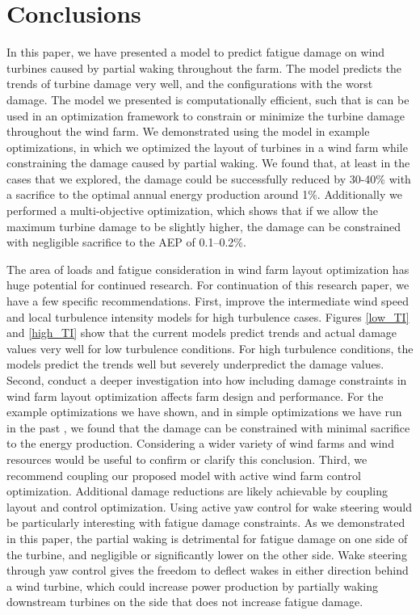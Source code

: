 \documentclass[11pt,letterpaper]{article}
\begin{document}
\section{Conclusions}
In this paper, we have presented a model to predict fatigue damage on wind turbines caused by partial waking throughout the farm. The model predicts the trends of turbine damage very well, and the configurations with the worst damage. The model we presented is computationally efficient, such that is can be used in an optimization framework to constrain or minimize the turbine damage throughout the wind farm. We demonstrated using the model in example optimizations, in which we optimized the layout of turbines in a wind farm while constraining the damage caused by partial waking. We found that, at least in the cases that we explored, the damage could be successfully reduced by 30-40\% with a sacrifice to the optimal annual energy production around 1\%. Additionally we performed a multi-objective optimization, which shows that if we allow the maximum turbine damage to be slightly higher, the damage can be constrained with negligible sacrifice to the AEP of 0.1--0.2\%.

The area of loads and fatigue consideration in wind farm layout optimization has huge potential for continued research. For continuation of this research paper, we have a few specific recommendations. 
% 
First, improve the intermediate wind speed and local turbulence intensity models for high turbulence cases.  Figures \ref{low_TI} and \ref{high_TI} show that the current models predict trends and actual damage values very well for low turbulence conditions. For high turbulence conditions, the models predict the trends well but severely underpredict the damage values. 
% 
Second, conduct a deeper investigation into how including damage constraints in wind farm layout optimization affects farm design and performance. For the example optimizations we have shown, and in simple optimizations we have run in the past \cite{stanley2020wind}, we found that the damage can be constrained with minimal sacrifice to the energy production. Considering a wider variety of wind farms and wind resources would be useful to confirm or clarify this conclusion.
% 
Third, we recommend coupling our proposed model with active wind farm control optimization. Additional damage reductions are likely achievable by coupling layout and control optimization. Using active yaw control for wake steering would be particularly interesting with fatigue damage constraints. As we demonstrated in this paper, the partial waking is detrimental for fatigue damage on one side of the turbine, and negligible or significantly lower on the other side. Wake steering through yaw control gives the freedom to deflect wakes in either direction behind a wind turbine, which could increase power production by partially waking downstream turbines on the side that does not increase fatigue damage.
\end{document}
